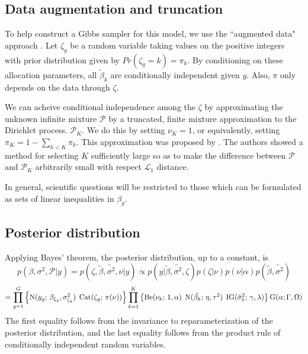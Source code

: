 \subsection{Data augmentation and truncation}
\label{subsec:reparam}
To help construct a Gibbs sampler for this model, we use the ``augmented data" approach \cite{tanner}. Let $\zeta_g$ be a random variable taking values on the positive integers with prior distribution given by $Pr(\zeta_g=k)=\pi_k$. By conditioning on these allocation parameters, all $\tilde{\beta}_k$ are conditionally independent given $y$. Also, $\pi$ only depends on the data through $\zeta$.

We can acheive conditional independence among the $\zeta$ by approximating the unknown infinite mixture $\mathcal{P}$ by a truncated, finite mixture approximation to the Dirichlet process. $\mathcal{P}_K$. We do this by setting $\nu_K=1$, or equivalently, setting $\pi_K = 1 - \sum_{k<K} \pi_k$. This approximation was proposed by \citet{ishwaran2000}. The authors showed a method for selecting $K$ sufficiently large so as to make the difference between $\mathcal{P}$ and $\mathcal{P}_K$ arbitrarily small with respect $\mathcal{L}_1$ distance. 

In general, scientific questions will be restricted to those which can be formulated as sets of linear inequalities in $\beta_g$. 

\subsection{Posterior distribution}
\label{subsec:posterior}
Applying Bayes' theorem, the posterior distribution, up to a constant, is
\begin{equation*}
p(\beta,\sigma^2,\mathcal{P}|y) = p(\zeta, \tilde{\beta},\tilde{\sigma^2},\nu | y) \propto p(y|\tilde{\beta},\tilde{\sigma^2},\zeta) p(\zeta|\nu) p(\nu|\alpha)p(\tilde{\beta},\tilde{\sigma^2})
\end{equation*}
\begin{equation*}
= \prod_{g=1}^G \left\{ \operatorname{N}(y_g;\,\beta_{\zeta_g},\sigma^2_{\zeta_g})\; \operatorname{Cat}(\zeta_g;\, \pi(\nu)) \right\} \prod_{k=1}^K \left\{ \operatorname{Be}(\nu_k;\, 1, \alpha)\; \operatorname{N}(\tilde{\beta_k};\,\eta, \tau^2)\;\operatorname{IG}(\tilde{\sigma}^2_k;\,\gamma,\lambda)\right\} \operatorname{G}(\alpha;\Gamma,\Omega) 
\end{equation*}
The first equality follows from the  invariance to reparameterization of the posterior distribution, and the last equality follows from the product rule of conditionally independent random variables.



